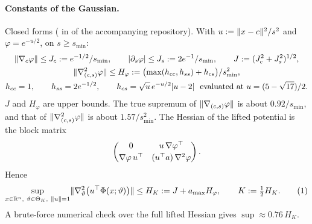 \paragraph{Constants of the Gaussian.} Closed forms ( in  of the
accompanying repository). With $u := \lVert x-c\rVert^2/s^2$ and
$\varphi = e^{-u/2}$, on $s\ge s_{\min}$:
\begin{gather*}
  \lVert \nabla_c\varphi\rVert\le J_c := e^{-1/2}/s_{\min},\qquad
  \lvert \partial_s\varphi\rvert\le J_s := 2e^{-1}/s_{\min},\qquad
  J := (J_c^2+J_s^2)^{1/2},\\
  \lVert \nabla^2_{(c,s)}\varphi\rVert\le H_\varphi := \bigl(\max(h_{cc},h_{ss}) + h_{cs}\bigr)/s_{\min}^2,\\
  h_{cc} = 1,\qquad h_{ss} = 2e^{-1/2},\qquad
  h_{cs} = \sqrt u\,e^{-u/2}\lvert u-2\rvert\ \text{ evaluated at } u = (5-\sqrt{17})/2 .
\end{gather*}
$J$ and $H_\varphi$ are upper bounds. The true supremum of $\lVert \nabla_{(c,s)}\varphi\rVert$ is about $0.92/s_{\min}$,
and that of $\lVert \nabla^2_{(c,s)}\varphi\rVert$ is about $1.57/s_{\min}^2$. The Hessian of the lifted potential is the
block matrix
\[
  \begin{pmatrix} 0 & u\,\nabla\varphi^\top\\[2pt] \nabla\varphi\,u^\top & (u^\top a)\,\nabla^2\varphi\end{pmatrix}.
\]
Hence
\begin{equation}\label{eq:setting:HK}
  \sup_{x\in\R^n,\ \vartheta\in\ThK,\ \norm{u}=1}\norm{\nabla^2_\vartheta\bigl(u^\T\Phi(x;\vartheta)\bigr)}
  \le H_K := J + a_{\max}H_\varphi,\qquad K := \tfrac12 H_K.
  \tag{1}
\end{equation}
A brute-force numerical check over the full lifted Hessian gives $\sup\approx 0.76\,H_K$.
